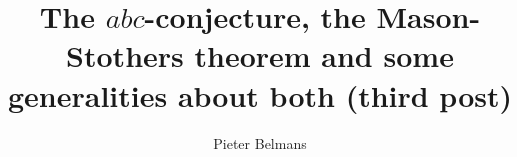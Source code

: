 \documentclass[11pt, a4paper, openany, oneside, article]{memoir}
\begin{document}
\title{The $abc$-conjecture, the Mason-Stothers theorem and some generalities about both (third post)}
\author{Pieter Belmans}
\maketitle


\end{document}

